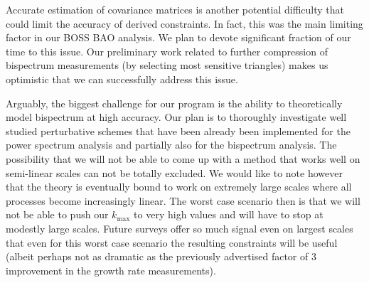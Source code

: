 
Accurate estimation of covariance matrices is another potential difficulty that
could limit the accuracy of derived constraints. In fact, this was the main
limiting factor in our BOSS BAO analysis. We plan to devote significant
fraction of our time to this issue. Our preliminary work related to further
compression of bispectrum measurements (by selecting most sensitive triangles)
makes us optimistic that we can successfully address this issue.

Arguably, the biggest challenge for our program is the ability to theoretically
model bispectrum at high accuracy. Our plan is to thoroughly investigate well
studied perturbative schemes that have been already been implemented for the
power spectrum analysis and partially also for the bispectrum analysis. The
possibility that we will not be able to come up with a method that works well
on semi-linear scales can not be totally excluded. We would like to note
however that the theory is eventually bound to work on extremely large scales
where all processes become increasingly linear. The worst case scenario then is
that we will not be able to push our $k_\mathrm{max}$ to very high values and
will have to stop at modestly large scales. Future surveys offer so much
signal even on largest scales that even for this worst case scenario the
resulting constraints will be useful (albeit perhaps not as dramatic as the
previously advertised factor of 3 improvement in the growth rate measurements).

